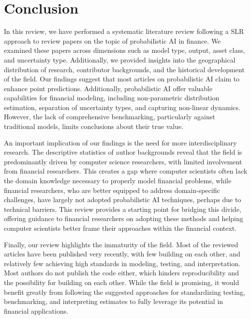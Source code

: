 \section{Conclusion}
\label{sec:conclusion}
In this review, we have performed a systematic literature review following a SLR approach to review \samplesize papers on the topic of probabilistic AI in finance. We examined these papers across dimensions such as model type, output, asset class, and uncertainty type. Additionally, we provided insights into the geographical distribution of research, contributor backgrounds, and the historical development of the field. Our findings suggest that most articles on probabilistic AI claim to enhance point predictions. Additionally, probabilistic AI offer valuable capabilities for financial modeling, including non-parametric distribution estimation, separation of uncertainty types, and capturing non-linear dynamics. However, the lack of comprehensive benchmarking, particularly against traditional models, limits conclusions about their true value.

An important implication of our findings is the need for more interdisciplinary research. The descriptive statistics of author backgrounds reveal that the field is predominantly driven by computer science researchers, with limited involvement from financial researchers. This creates a gap where computer scientists often lack the domain knowledge necessary to properly model financial problems, while financial researchers, who are better equipped to address domain-specific challenges, have largely not adopted probabilistic AI techniques, perhaps due to technical barriers. This review provides a starting point for bridging this divide, offering guidance to financial researchers on adopting these methods and helping computer scientists better frame their approaches within the financial context.

Finally, our review highlights the immaturity of the field. Most of the reviewed articles have been published very recently, with few building on each other, and relatively few achieving high standards in modeling, testing, and interpretation. Most authors do not publish the code either, which hinders reproducibility and the possibility for building on each other. While the field is promising, it would benefit greatly from following the suggested approaches for standardizing testing, benchmarking, and interpreting estimates to fully leverage its potential in financial applications.
